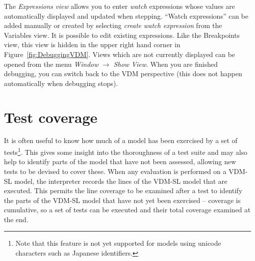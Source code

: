 The \emph{Expressions view} allows you to enter \emph{watch} expressions whose values are automatically displayed and updated when stepping. ``Watch expressions'' can be added manually or created by selecting \emph{create watch expression} from the Variables view. It is possible to edit existing expressions.  Like the Breakpoints view, this view is hidden in the upper right hand corner in Figure~\ref{fig:DebuggingVDM}.  Views which are not currently displayed can be opened from the menu \emph{Window} $\rightarrow$ \emph{Show View}.  When you are finished debugging, you can switch back to the VDM perspective (this does not happen automatically when debugging stops).
%
\section{Test coverage}\label{sec:testcov}
It is often useful to know how much of a model has been exercised by a set of tests\footnote{Note that this feature is not yet supported for models using unicode characters such as Japanese identifiers.}. 
This gives some insight into the thoroughness of a test suite and may also help to identify parts of the model that have not been assessed, allowing new tests to be devised to cover these. When any evaluation is performed on a VDM-SL model, the interpreter records the lines of the VDM-SL model that are executed. This permits the line coverage to be examined after a test to identify the parts of the
VDM-SL model that have not yet been exercised -- coverage is cumulative, so a set of tests can be executed and their total coverage examined at the end.

